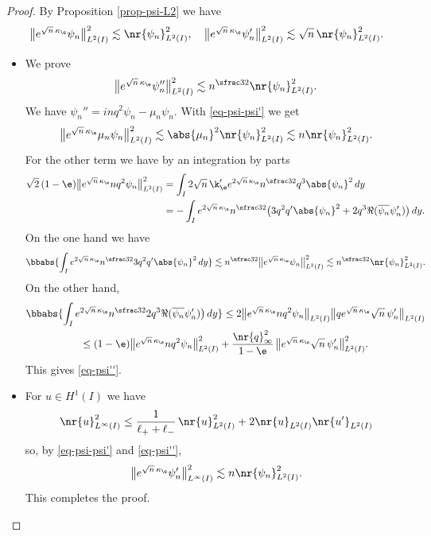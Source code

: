 \begin{proof}
By Proposition \ref{prop-psi-L2} we have
\begin{equation} \label{eq-psi-psi'}
\big\|e^{\sqrt n\,\kappa_\e} \psi_n\big\|_{L^2(I)}^2 \lesssim \nr{\psi_n}_{L^2(I)}^2, \quad
\big\|e^{\sqrt n\,\kappa_\e} \psi_n'\big\|_{L^2(I)}^2 \lesssim \sqrt n\,\nr{\psi_n}_{L^2(I)}^2.
\end{equation}

\begin{itemize}
\item
We prove
\begin{equation} \label{eq-psi''}
\big\|e^{\sqrt n\,\kappa_\e} \psi_n''\big\|_{L^2(I)}^2 \lesssim n^{\sfrac 32} \nr{\psi_n}_{L^2(I)}^2.
\end{equation}
We have $\psi_n'' = inq^2 \psi_n - \mu_n \psi_n$. With \eqref{eq-psi-psi'} we get
\[
\big\| e^{\sqrt n\,\kappa_\e} \mu_n \psi_n \big\|_{L^2(I)}^2 \lesssim \abs{\mu_n}^2 \nr{\psi_n}_{L^2(I)}^2 \lesssim n \nr{\psi_n}_{L^2(I)}^2.
\]
For the other term we have by an integration by parts
\begin{align*}
\sqrt 2\, (1-\e) \big\| e^{\sqrt n\,\kappa_\e} n q^2 \psi_n \big\|_{L^2(I)}^2
& = \int_I 2 \sqrt n\,\k_\e' e^{2 \sqrt n\,\kappa_\e} n^{\sfrac 32} q^3 \abs{\psi_n}^2 \, dy\\
& = -\int_I e^{2 \sqrt n\,\kappa_\e} n^{\sfrac 32} \bigl(3 q^2 q' \abs{\psi_n}^2 + 2 q^3 \Re(\overline{\psi_n} \psi_n') \bigr) \, dy.
\end{align*}
On the one hand we have
\[
\bbabs{\int_I e^{2 \sqrt n\,\kappa_\e} n^{\sfrac 32} 3 q^2 q' \abs{\psi_n}^2 \, dy} \lesssim n^{\sfrac 32} \big\| e^{\sqrt n\,\kappa_\e} \psi_n \big\|_{L^2(I)}^2 \lesssim n^{\sfrac 32} \nr{\psi_n}_{L^2(I)}^2.
\]
On the other hand,
\begin{multline*}
\bbabs{\int_I e^{2 \sqrt n\,\kappa_\e} n^{\sfrac 32} 2 q^3 \Re(\overline{\psi_n} \psi_n') \bigr) \, dy} \leq 2 \big\|e^{\sqrt n\,\kappa_\e} n q^2 \psi_n\big\|_{L^2(I)} \big\| q e^{\sqrt n\,\kappa_\e} \sqrt n\,\psi_n'\big\|_{L^2(I)}\\
\leq (1-\e) \big\|e^{\sqrt n\,\kappa_\e} n q^2 \psi_n\big\|_{L^2(I)}^2 + \frac {\nr{q}_\infty^2}{1-\e}\, \big\|e^{\sqrt n\,\kappa_\e} \sqrt n\,\psi_n'\big\|_{L^2(I)}^2.
\end{multline*}
This gives \eqref{eq-psi''}.

\item
For $u \in H^1(I)$ we have
\[
\nr{u}_{L^\infty(I)}^2 \leq \frac{1}{\ell_+ +\ell_-}\, \nr{u}_{L^2(I)}^2 + 2 \nr{u}_{L^2(I)}\nr{u'}_{L^2(I)}
\]
so, by \eqref{eq-psi-psi'} and \eqref{eq-psi''},
\begin{align*}
\big\|e^{\sqrt n\,\kappa_\e} \psi_n'\big\|_{L^\infty(I)}^2
\lesssim n \nr{\psi_n}_{L^2(I)}^2.
\end{align*}
This completes the proof.\qedhere
\end{itemize}
\end{proof}

